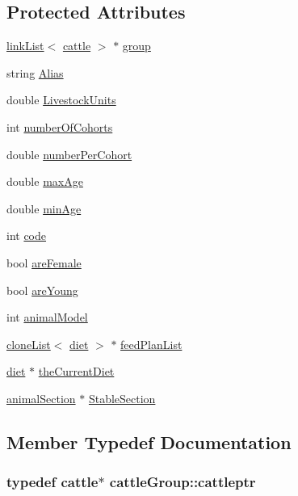 \subsection*{Protected Attributes}
\begin{DoxyCompactItemize}
\item 
\hyperlink{classlink_list}{linkList}$<$ \hyperlink{classcattle}{cattle} $>$ $\ast$ \hyperlink{classcattle_group_a1c789faa51d78a698838f6bed968bf18}{group}
\item 
string \hyperlink{classcattle_group_a4c70beb9810cf524d61e750781a1aaf6}{Alias}
\item 
double \hyperlink{classcattle_group_a7b4e3d4605387018845a000bb8721cb8}{LivestockUnits}
\item 
int \hyperlink{classcattle_group_a5cd24310ad3a445124c635e5ba4e3664}{numberOfCohorts}
\item 
double \hyperlink{classcattle_group_a33953aa20c4d369b4ea2d34aadfa7611}{numberPerCohort}
\item 
double \hyperlink{classcattle_group_afdc5fd94822e9734eff0f298cc5d7a21}{maxAge}
\item 
double \hyperlink{classcattle_group_aa1b9dd62ca0a63632fd7ae743c893b09}{minAge}
\item 
int \hyperlink{classcattle_group_a19e433886e9ece2f2005ade6b28f6b2b}{code}
\item 
bool \hyperlink{classcattle_group_a1748b0591b31f5aa3071dd05d8ad06af}{areFemale}
\item 
bool \hyperlink{classcattle_group_acb05bccffb8970efd702940d4bd27b2a}{areYoung}
\item 
int \hyperlink{classcattle_group_a801aff18209e94bd90e17ffa336fc504}{animalModel}
\item 
\hyperlink{classclone_list}{cloneList}$<$ \hyperlink{classdiet}{diet} $>$ $\ast$ \hyperlink{classcattle_group_ab56b9562942c055255babfb640612261}{feedPlanList}
\item 
\hyperlink{classdiet}{diet} $\ast$ \hyperlink{classcattle_group_ae11a48f54c12141636ea3bb1a47481ee}{theCurrentDiet}
\item 
\hyperlink{classanimal_section}{animalSection} $\ast$ \hyperlink{classcattle_group_a5af469b87a56a3051f06d3318266cc34}{StableSection}
\end{DoxyCompactItemize}


\subsection{Member Typedef Documentation}
\hypertarget{classcattle_group_ab46f6051e0fca98c9771d4cefa0e8804}{
\subsubsection[{cattleptr}]{\setlength{\rightskip}{0pt plus 5cm}typedef {\bf cattle}$\ast$ {\bf cattleGroup::cattleptr}}}
\label{classcattle_group_ab46f6051e0fca98c9771d4cefa0e8804}



